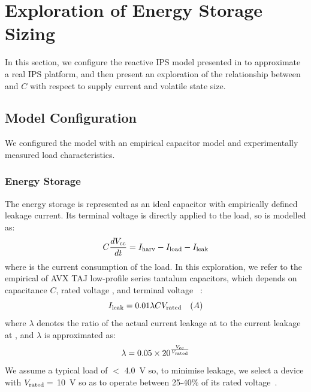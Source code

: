 \section{Exploration of Energy Storage Sizing} \label{sec:c3_exploration}


In this section, we configure the reactive IPS model presented in  to approximate a real IPS platform, and then present an exploration of the relationship between  and $C$ with respect to supply current  and volatile state size.

\subsection{Model Configuration}

We configured the model with an empirical capacitor model and experimentally measured load characteristics. 

\subsubsection{Energy Storage}

The energy storage is represented as an ideal capacitor with empirically defined leakage current. 
Its terminal voltage is directly applied to the load, so is modelled as:
\begin{equation}
  C \frac{dV_{\text{cc}}}{dt} = I_{\text{harv}} - I_{\text{load}} - I_{\text{leak}}
\end{equation}
where  is the current consumption of the load. 
In this exploration, we refer to the empirical  of AVX TAJ low-profile series tantalum capacitors, which depends on capacitance $C$, rated voltage , and terminal voltage ~\cite{avxleakage}:
\begin{equation}
    I_{\text{leak}} = 0.01 \lambda C V_{\text{rated}} \quad (A)
\end{equation}
where $\lambda$ denotes the ratio of the actual current leakage at  to the current leakage at , and $\lambda$ is approximated as: 
\begin{equation}
    \lambda = 0.05 \times 20^{\frac{V_{\text{cc}}}{V_{\text{rated}}}}
\end{equation}
We assume a typical load of $<$ \SI{4.0}{\volt} so, to minimise leakage, we select a device with $V_{\text{rated}} =$ \SI{10}{\volt} so as to operate between 25-40\% of its rated voltage~\cite{avxleakage}. 

